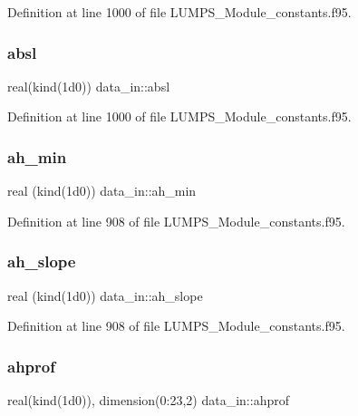 Definition at line 1000 of file L\+U\+M\+P\+S\+\_\+\+Module\+\_\+constants.\+f95.

\mbox{\label{namespacedata__in_a110ac150ce724bc8739056a64c759aa0}} 
\subsubsection{\texorpdfstring{absl}{absl}}
{\footnotesize\ttfamily real(kind(1d0)) data\+\_\+in\+::absl}



Definition at line 1000 of file L\+U\+M\+P\+S\+\_\+\+Module\+\_\+constants.\+f95.

\mbox{\label{namespacedata__in_a711f2f13bee1efd47bef091504e3621d}} 
\subsubsection{\texorpdfstring{ah\+\_\+min}{ah\_min}}
{\footnotesize\ttfamily real (kind(1d0)) data\+\_\+in\+::ah\+\_\+min}



Definition at line 908 of file L\+U\+M\+P\+S\+\_\+\+Module\+\_\+constants.\+f95.

\mbox{\label{namespacedata__in_ac10bf0a69520b391a81ee64742a4f6fd}} 
\subsubsection{\texorpdfstring{ah\+\_\+slope}{ah\_slope}}
{\footnotesize\ttfamily real (kind(1d0)) data\+\_\+in\+::ah\+\_\+slope}



Definition at line 908 of file L\+U\+M\+P\+S\+\_\+\+Module\+\_\+constants.\+f95.

\mbox{\label{namespacedata__in_adacab1a738e29a24443b23231bf40111}} 
\subsubsection{\texorpdfstring{ahprof}{ahprof}}
{\footnotesize\ttfamily real(kind(1d0)), dimension(0\+:23,2) data\+\_\+in\+::ahprof}



